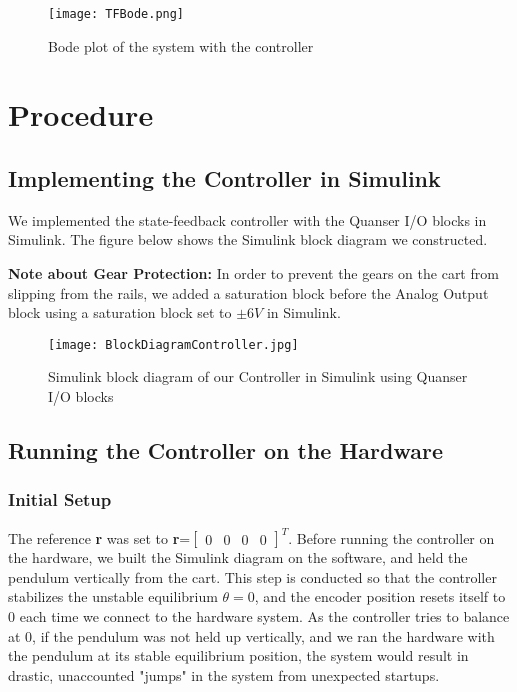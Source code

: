 \documentclass[11pt, twoside, letterpaper]{article}   	%
\begin{document}
\begin{enumerate}
\begin{figure}[htbp]
\begin{center}
\texttt{[image: TFBode.png]}
\caption{Bode plot of the system with the controller}
\label{default}
\end{center}
\end{figure}
\FloatBarrier

\end{enumerate} 

\newpage
\section{Procedure}
\subsection{Implementing the Controller in Simulink}
We implemented the state-feedback controller with the Quanser I/O blocks in Simulink.  The figure below shows the Simulink block diagram we constructed.

\textbf{Note about Gear Protection:}
In order to prevent the gears on the cart from slipping from the rails, we added a saturation block before the Analog Output block using a saturation block set to $\pm6V$ in Simulink.

\begin{figure}[htbp]
\begin{center}
\texttt{[image: BlockDiagramController.jpg]}
\caption{Simulink block diagram of our Controller in Simulink using Quanser I/O blocks}
\label{default}
\end{center}
\end{figure}
\FloatBarrier

\subsection{Running the Controller on the Hardware}
\subsubsection{Initial Setup}
The reference \textbf{r} was set to \textbf{r}=$ \begin{bmatrix} 0 & 0 & 0 &0 \end{bmatrix}^T$.  Before running the controller on the hardware, we built the Simulink diagram on the software, and held the pendulum vertically from the cart.  This step is conducted so that the controller stabilizes the unstable equilibrium $\theta = 0$, and the encoder position resets itself to 0 each time we connect to the hardware system.  As the controller tries to balance at 0, if the pendulum was not held up vertically, and we ran the hardware with the pendulum at its stable equilibrium position, the system would result in drastic, unaccounted "jumps" in the system from unexpected startups.
\end{document}
